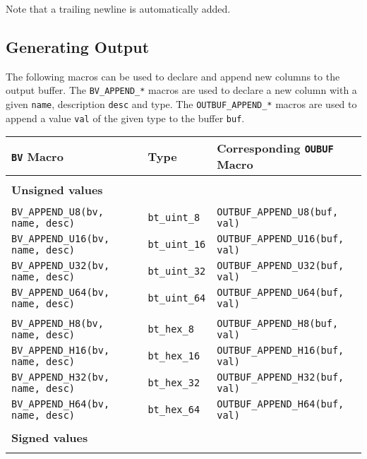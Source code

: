 \documentclass[documentation]{subfiles}
\begin{document}
Note that a trailing newline is automatically added.

\subsection{Generating Output}\label{section:output}

The following macros can be used to declare and append new columns to the output buffer.
The {\tt BV\_APPEND\_*} macros are used to declare a new column with a given {\tt name}, description {\tt desc} and type.
The {\tt OUTBUF\_APPEND\_*} macros are used to append a value {\tt val} of the given type to the buffer {\tt buf}.

\begin{longtable}{lll}
    \toprule
    {\bf {\tt BV} Macro} & {\bf Type} & {\bf Corresponding {\tt OUBUF} Macro}\\
    \midrule

    \\\multicolumn{3}{l}{\bf Unsigned values}\\\\

    {\tt BV\_APPEND\_U8(bv, name, desc)}  & {\tt bt\_uint\_8}  & {\tt OUTBUF\_APPEND\_U8(buf, val)}\\
    {\tt BV\_APPEND\_U16(bv, name, desc)} & {\tt bt\_uint\_16} & {\tt OUTBUF\_APPEND\_U16(buf, val)}\\
    {\tt BV\_APPEND\_U32(bv, name, desc)} & {\tt bt\_uint\_32} & {\tt OUTBUF\_APPEND\_U32(buf, val)}\\
    {\tt BV\_APPEND\_U64(bv, name, desc)} & {\tt bt\_uint\_64} & {\tt OUTBUF\_APPEND\_U64(buf, val)}\\
    \\
    {\tt BV\_APPEND\_H8(bv, name, desc)}  & {\tt bt\_hex\_8}  & {\tt OUTBUF\_APPEND\_H8(buf, val)}\\
    {\tt BV\_APPEND\_H16(bv, name, desc)} & {\tt bt\_hex\_16} & {\tt OUTBUF\_APPEND\_H16(buf, val)}\\
    {\tt BV\_APPEND\_H32(bv, name, desc)} & {\tt bt\_hex\_32} & {\tt OUTBUF\_APPEND\_H32(buf, val)}\\
    {\tt BV\_APPEND\_H64(bv, name, desc)} & {\tt bt\_hex\_64} & {\tt OUTBUF\_APPEND\_H64(buf, val)}\\

    \\\multicolumn{3}{l}{\bf Signed values}\\\\


\end{longtable}
\end{document}
